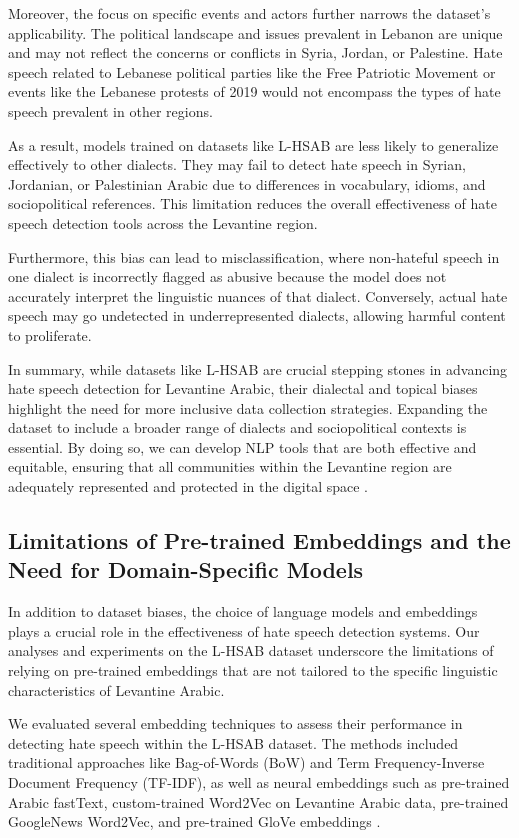 \documentclass[11pt]{article}
\begin{document}
Moreover, the focus on specific events and actors further narrows the dataset's applicability. The political landscape and issues prevalent in Lebanon are unique and may not reflect the concerns or conflicts in Syria, Jordan, or Palestine. Hate speech related to Lebanese political parties like the Free Patriotic Movement or events like the Lebanese protests of 2019 would not encompass the types of hate speech prevalent in other regions.

As a result, models trained on datasets like L-HSAB are less likely to generalize effectively to other dialects. They may fail to detect hate speech in Syrian, Jordanian, or Palestinian Arabic due to differences in vocabulary, idioms, and sociopolitical references. This limitation reduces the overall effectiveness of hate speech detection tools across the Levantine region.

Furthermore, this bias can lead to misclassification, where non-hateful speech in one dialect is incorrectly flagged as abusive because the model does not accurately interpret the linguistic nuances of that dialect. Conversely, actual hate speech may go undetected in underrepresented dialects, allowing harmful content to proliferate.

In summary, while datasets like L-HSAB are crucial stepping stones in advancing hate speech detection for Levantine Arabic, their dialectal and topical biases highlight the need for more inclusive data collection strategies. Expanding the dataset to include a broader range of dialects and sociopolitical contexts is essential. By doing so, we can develop NLP tools that are both effective and equitable, ensuring that all communities within the Levantine region are adequately represented and protected in the digital space \citep{barocas-hardt-narayanan}.


\subsection{Limitations of Pre-trained Embeddings and the Need for Domain-Specific Models}

In addition to dataset biases, the choice of language models and embeddings plays a crucial role in the effectiveness of hate speech detection systems. Our analyses and experiments on the L-HSAB dataset underscore the limitations of relying on pre-trained embeddings that are not tailored to the specific linguistic characteristics of Levantine Arabic.

We evaluated several embedding techniques to assess their performance in detecting hate speech within the L-HSAB dataset. The methods included traditional approaches like Bag-of-Words (BoW) and Term Frequency-Inverse Document Frequency (TF-IDF), as well as neural embeddings such as pre-trained Arabic fastText, custom-trained Word2Vec on Levantine Arabic data, pre-trained GoogleNews Word2Vec, and pre-trained GloVe embeddings \citep{Harris1954DistributionalS, 10.5555/106765.106782, bojanowski2016enriching, mikolov2013efficientestimationwordrepresentations, pennington-etal-2014-glove}.
\end{document}
